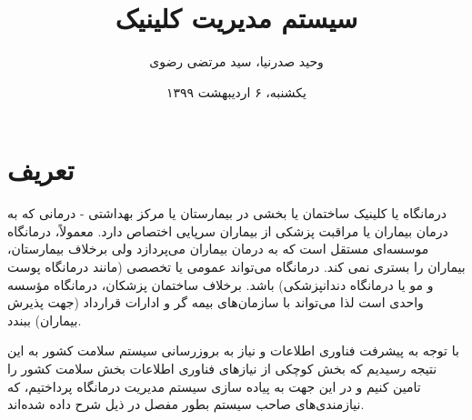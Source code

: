 \documentclass[a4paper,12pt]{article}
\begin{document}
	
	\renewcommand{\bibname}{مراجع}
	
	\title{
		سیستم مدیریت کلینیک
	}
	\author{
		وحید صدرنیا، سید مرتضی رضوی
	}
	\date{
		یکشنبه، ۶ اردیبهشت ۱۳۹۹
	}

	\maketitle
	
	\section*{تعریف}\label{chap13}
	
	درمانگاه یا کلینیک 
	ساختمان یا بخشی در بیمارستان یا مرکز بهداشتی - درمانی که به درمان بیماران یا مراقبت پزشکی از بیماران سرپایی اختصاص دارد. معمولاً، درمانگاه موسسه‌ای مستقل است که به درمان بیماران می‌پردازد ولی برخلاف بیمارستان، بیماران را بستری نمی کند. درمانگاه می‌تواند عمومی یا تخصصی (مانند درمانگاه پوست و مو یا درمانگاه دندانپزشکی) باشد. برخلاف ساختمان پزشکان، درمانگاه مؤسسه واحدی است لذا می‌تواند با سازمان‌های بیمه گر و ادارات قرارداد (جهت پذیرش بیماران) ببندد.
	
	با توجه به پیشرفت فناوری اطلاعات و نیاز به بروزرسانی سیستم سلامت کشور به این نتیجه رسیدیم که بخش کوچکی از نیازهای فناوری اطلاعات بخش سلامت کشور را تامین کنیم و در این جهت به  پیاده سازی سیستم مدیریت درمانگاه پرداختیم، که نیازمندی‌های صاحب سیستم بطور مفصل در ذیل شرح داده شده‌اند.
	
\end{document}
